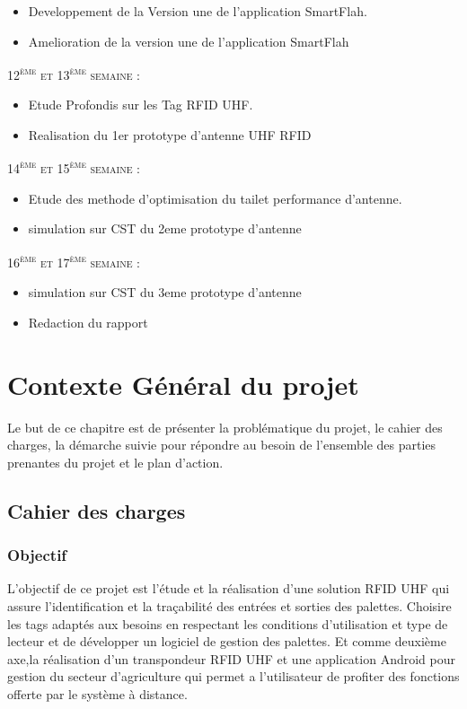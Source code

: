 \documentclass[11pt, a4paper, twoside]{book}
\begin{document}
\begin{itemize}
\item Developpement de la Version une de l'application SmartFlah.
\item Amelioration de la version une de l'application SmartFlah
\end{itemize}
\textsc{12\textsuperscript{ème} et 13\textsuperscript{ème} semaine :}
\begin{itemize}
\item Etude Profondis sur les Tag RFID UHF.
\item Realisation du 1er prototype d'antenne UHF RFID
\end{itemize}
\textsc{14\textsuperscript{ème} et 15\textsuperscript{ème} semaine :}
\begin{itemize}
\item Etude des methode d'optimisation du tailet performance d'antenne.
\item simulation sur CST du 2eme prototype d'antenne
\end{itemize}
\textsc{16\textsuperscript{ème} et 17\textsuperscript{ème} semaine :}
\begin{itemize}
\item simulation sur CST du 3eme prototype d'antenne
\item Redaction du rapport
\end{itemize}



\chapter{Contexte Général du projet}
Le but de ce chapitre est de présenter la problématique du projet, le cahier des charges, la démarche suivie pour répondre au besoin de l’ensemble des parties prenantes du projet et le plan d’action.
\section{Cahier des charges}
\subsection{Objectif}
L’objectif de ce projet est l'étude et la réalisation d’une solution RFID UHF qui assure l’identification et la traçabilité des entrées et sorties des palettes. Choisire les tags adaptés aux besoins en respectant les conditions d’utilisation et type de lecteur et de développer un logiciel de gestion des palettes. 
Et comme deuxième axe,la réalisation d’un transpondeur RFID UHF et une application Android pour gestion du secteur d'agriculture qui permet a
l’utilisateur de profiter des fonctions offerte par le système à distance. \\
\end{document}
